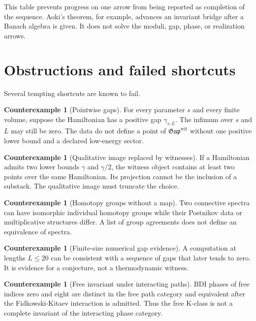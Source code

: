 \documentclass[12pt]{article}
\theoremstyle{definition}
\newtheorem{counterexample}[theorem]{Counterexample}
\theoremstyle{remark}
\newcommand{\Gap}{\mathfrak{Gap}}
\begin{document}
This table prevents progress on one arrow from being reported as completion
of the sequence.  Aoki's theorem, for example, advances an invariant bridge
after a Banach algebra is given.  It does not solve the moduli, gap, phase,
or realization arrows.

\section{Obstructions and failed shortcuts}

Several tempting shortcuts are known to fail.

\begin{counterexample}[Pointwise gaps]
For every parameter $s$ and every finite volume, suppose the Hamiltonian has
a positive gap $\gamma_{s,L}$.  The infimum over $s$ and $L$ may still be
zero.  The data do not define a point of $\Gap^{\mathrm{wit}}$ without one
positive lower bound and a declared low-energy sector.
\end{counterexample}

\begin{counterexample}[Qualitative image replaced by witnesses]
If a Hamiltonian admits two lower bounds $\gamma$ and $\gamma/2$, the witness
object contains at least two points over the same Hamiltonian.  Its projection
cannot be the inclusion of a substack.  The qualitative image must truncate
the choice.
\end{counterexample}

\begin{counterexample}[Homotopy groups without a map]
Two connective spectra can have isomorphic individual homotopy groups while
their Postnikov data or multiplicative structures differ.  A list of group
agreements does not define an equivalence of spectra.
\end{counterexample}

\begin{counterexample}[Finite-size numerical gap evidence]
A computation at lengths $L\le20$ can be consistent with a sequence of gaps
that later tends to zero.  It is evidence for a conjecture, not a
thermodynamic witness.
\end{counterexample}

\begin{counterexample}[Free invariant under interacting paths]
BDI phases of free indices zero and eight are distinct in the free path
category and equivalent after the Fidkowski-Kitaev interaction is admitted.
Thus the free K-class is not a complete invariant of the interacting phase
category.
\end{counterexample}
\end{document}
